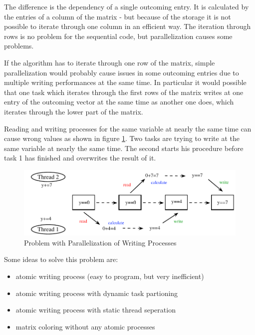 \documentclass[a4paper,11pt]{scrartcl}
\begin{document}
The difference is the dependency of a single outcoming entry. It is calculated
 by the entries of a column of the matrix - but because of the storage it is not
possible to iterate through one column in an efficient way. The iteration through 
rows is no problem for the sequential code, but parallelization causes some
problems.

 If the algorithm has to iterate through one row of the matrix, simple 
parallelization would probably cause issues in some outcoming entries
 due to multiple writing performances at the same time. In particular it would
possible that one task which iterates through the first rows of the matrix
writes at one entry of the outcoming vector at the same time as another one
does, which iterates through the lower part of the matrix.

Reading and writing processes for the same variable at nearly the same 
time can cause wrong values as shown in figure \ref{figure:parallelwriting}. Two
tasks are trying to write at the same variable at nearly the same time. The second
starts his procedure before task 1 has finished and overwrites the result of it.

\begin{figure}[ht]
\label{figure:parallelwriting}
\includegraphics{graphic/parallel_writing_problem.pdf}
\caption{Problem with Parallelization of Writing Processes}
\end{figure}

Some ideas to solve this problem are:

\begin{itemize}

\item atomic writing process (easy to program, but very inefficient)
\item atomic writing process with dynamic task partioning
\item atomic writing process with static thread seperation
\item matrix coloring without any atomic processes

\end{itemize}
\end{document}
